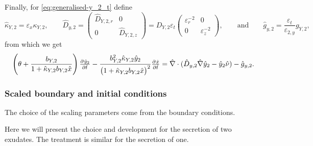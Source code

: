 \documentclass[11pt]{article}
\numberwithin{equation}{section}
\begin{document}
Finally, for \eqref{eq:generalised-y_2_t} define
\[
    \hat{\kappa}_{Y,2} = \varepsilon_{x} \kappa_{Y,2},
    \qquad
    \hat{D}_{y,2} = 
    \begin{pmatrix}
         \hat{D}_{Y,2,r} & 0 
         \\
        0 &  \hat{D}_{Y,2,z}
    \end{pmatrix}
    =
    D_{Y,2} \varepsilon_t
    \begin{pmatrix}
         \varepsilon_r^{-2} & 0 
         \\
        0 &  \varepsilon_z^{-2}
    \end{pmatrix},
    \qquad\text{and}\qquad
    \hat{g}_{y,2} = \frac{\varepsilon_t}{\varepsilon_{2,y}} g_{Y,2},
\]
from which we get
\begin{equation}
    \left(\theta + \frac{b_{Y,2}}{1 + \hat{\kappa}_{Y,2} b_{Y,2} \hat{x}}\right) \pd{\hat{y}_2}{\hat{t}}
    - 
    \frac{ b_{Y,2}^2 \hat{\kappa}_{Y,2} \hat{y}_2 }{\big(1 + \hat{\kappa}_{Y,2} b_{Y,2} \hat{x} \big)^2} \pd{\hat{x}}{\hat{t}} 
    = 
    \hat{\nabla} \cdot(\hat{D}_{y,2} \hat{\nabla} \hat{y}_{2} - \hat{y}_2 \hat{\nu}  ) - \hat{g}_{y,2}.
\end{equation}



\subsubsection{Scaled boundary and initial conditions}

The choice of the scaling parameters come from the boundary conditions. 



Here we will present the choice and development for the secretion of two exudates. The treatment is similar for the secretion of one. 
\end{document}
